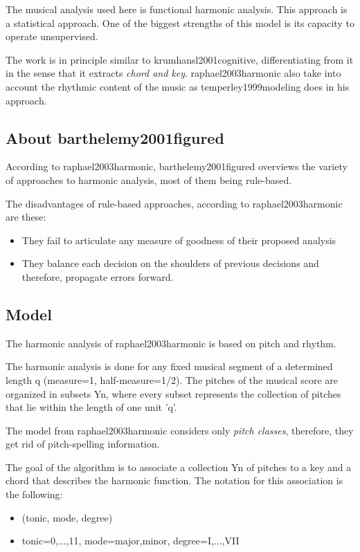		The musical analysis used here is functional harmonic analysis. This approach is a statistical approach. One of the biggest strengths of this model is its capacity to operate unsupervised.

		The work is in principle similar to krumhansl2001cognitive, differentiating from it in the sense that it extracts \emph{chord and key}. raphael2003harmonic also take into account the rhythmic content of the music as temperley1999modeling does in his approach.



		\subsection{About barthelemy2001figured}
			According to raphael2003harmonic, barthelemy2001figured overviews the variety of approaches to harmonic analysis, most of them being rule-based.

			The disadvantages of rule-based approaches, according to raphael2003harmonic are these:
			\begin{itemize}
				\item They fail to articulate any measure of goodness of their proposed analysis
				\item They balance each decision on the shoulders of previous decisions and therefore, propagate errors forward.
			\end{itemize}

		\subsection{Model}
			The harmonic analysis of raphael2003harmonic is based on pitch and rhythm.

			The harmonic analysis is done for any fixed musical segment of a determined length q (measure=1, half-measure=1/2). The pitches of the musical score are organized in subsets Yn, where every subset represents the collection of pitches that lie within the length of one unit 'q'.

			The model from raphael2003harmonic considers only \emph{pitch classes}, therefore, they get rid of pitch-spelling information.

			The goal of the algorithm is to associate a collection Yn of pitches to a key and a chord that describes the harmonic function. The notation for this association is the following:
			\begin{itemize}
				\item (tonic, mode, degree)
				\item tonic={0,...,11}, mode={major,minor}, degree={I,...,VII}
			\end{itemize}

